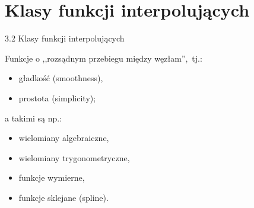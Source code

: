 \section{Klasy funkcji interpolujących}
	\begin{frame}{3.2 Klasy funkcji interpolujących}

	

	Funkcje o ,,rozsądnym przebiegu między węzłam'',\ tj.:

	\setlength\parindent{24pt} 
\begin{itemize}
    \item gładkość (smoothness),
    
    \item prostota (simplicity);
\end{itemize}
	\noindent a takimi są np.:
\begin{itemize}
	\item wielomiany algebraiczne,

	\item wielomiany trygonometryczne,

	\item funkcje wymierne,

	\item funkcje sklejane (spline).
\end{itemize}
    \end{frame}

